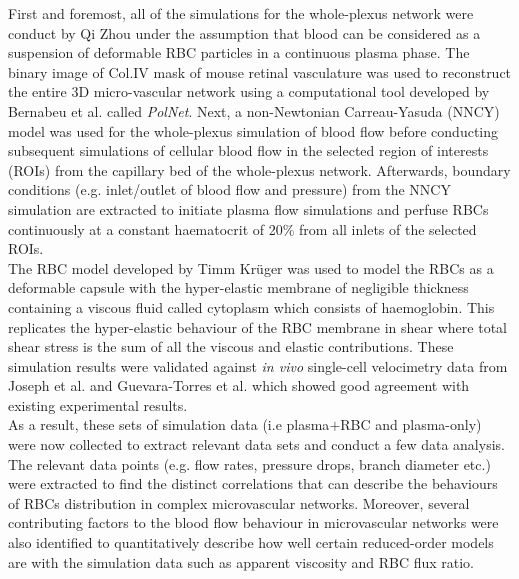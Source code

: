 \noindent First and foremost, all of the simulations for the whole-plexus network were conduct by Qi Zhou\cite{2020Charles} under the assumption that blood can be considered as a suspension of deformable RBC particles in a continuous plasma phase. The binary image of Col.IV mask of mouse retinal vasculature was used to reconstruct the entire 3D micro-vascular network using a computational tool developed by Bernabeu et al. called \textit{PolNet}.\cite{bernabeu2018polnet} Next, a non-Newtonian Carreau-Yasuda (NNCY) model\cite{Bernabeu2014} was used for the whole-plexus simulation of blood flow before conducting subsequent simulations of cellular blood flow in the selected region of interests (ROIs) from the capillary bed of the whole-plexus network. Afterwards, boundary conditions (e.g. inlet/outlet of blood flow and pressure) from the NNCY simulation are extracted to initiate plasma flow simulations and perfuse RBCs continuously at a constant haematocrit of 20\% from all inlets of the selected ROIs. \\


\noindent The RBC model developed by Timm Kr\"{u}ger\cite{KrugerTimm2012Csso} was used to model the RBCs as a deformable capsule with the hyper-elastic membrane of negligible thickness containing a viscous fluid called cytoplasm which consists of haemoglobin. This replicates the hyper-elastic behaviour of the RBC membrane in shear where total shear stress is the sum of all the viscous and elastic contributions. These simulation results were validated against \textit{in vivo} single-cell velocimetry data from Joseph et al.\cite{JosephAby2019Isbf} and Guevara-Torres et al.\cite{Guevara-Torres2016} which showed good agreement with existing experimental results. \\


\noindent As a result, these sets of simulation data (i.e plasma$+$RBC and plasma-only) were now collected to extract relevant data sets and conduct a few data analysis. The relevant data points (e.g. flow rates, pressure drops, branch diameter etc.) were extracted to find the distinct correlations that can describe the behaviours of RBCs distribution in complex microvascular networks. Moreover, several contributing factors to the blood flow behaviour in microvascular networks were also identified to quantitatively describe how well certain reduced-order models are with the simulation data such as apparent viscosity and RBC flux ratio. \\


